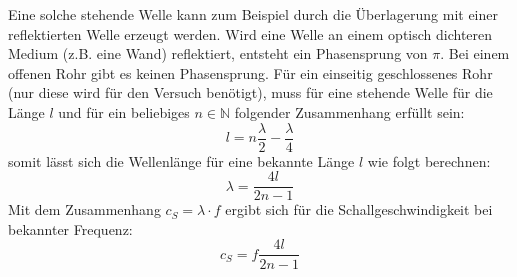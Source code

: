 Eine solche stehende Welle kann zum Beispiel durch die Überlagerung mit einer reflektierten Welle erzeugt werden. Wird eine Welle an einem optisch dichteren Medium (z.B. eine Wand) reflektiert, entsteht ein Phasensprung von $\pi$. Bei einem offenen Rohr gibt es keinen Phasensprung. Für ein einseitig geschlossenes Rohr (nur diese wird für den Versuch benötigt), muss für eine stehende Welle für die Länge $l$ und für ein beliebiges $n \in \mathbb{N}$ folgender Zusammenhang erfüllt sein:
\begin{equation*}
l = n \frac{\lambda}{2}-\frac{\lambda}{4}
\end{equation*}
somit lässt sich die Wellenlänge für eine bekannte Länge $l$ wie folgt berechnen:
\begin{equation}
\lambda = \frac{4l}{2n-1}
\label{eq:wavelength}
\end{equation}
Mit dem Zusammenhang $c_S = \lambda \cdot f$ ergibt sich für die Schallgeschwindigkeit bei bekannter Frequenz:
\begin{equation}
c_S = f \frac{4l}{2n-1}
\label{eq:speedFreq}
\end{equation}




